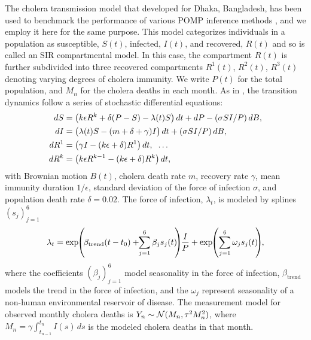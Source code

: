 \documentclass[9pt,twocolumn,pnasresearcharticle]{pnas-new}
\begin{document}
The cholera transmission model that \cite{king08} developed for Dhaka, Bangladesh, has been used to benchmark the performance of various POMP inference methods \cite{ionides15, fasiolo16, wycoff24}, and we employ it here for the same purpose.
This model categorizes individuals in a population as susceptible, $S(t)$, infected, $I(t)$, and recovered, $R(t)$ and so is called an SIR compartmental model.
In this case, the compartment $R(t)$ is further subdivided into 
three recovered compartments $R^1(t)$, $R^2(t)$, $R^3(t)$ denoting varying degrees of cholera immunity.
We write $P(t)$ for the total population, and $M_n$ for the cholera deaths in each month.
As in \cite{king08, ionides15}, the transition dynamics follow a series of stochastic differential equations:
\vspace*{-1mm}
\begin{align*}
    dS&=\big(k \epsilon R^k+\delta(P-S)-\lambda(t) S\big)\, dt+d P-({\sigma S I}/{P})\, dB, \\
    dI&=\big(\lambda(t) S-(m+\delta+\gamma) I\big)\, dt+({\sigma S I}/{P})\, dB, \\
    dR^1&=\big(\gamma I-(k \epsilon+\delta) R^1\big)\, dt, \hspace{2mm} \dots \\
    dR^k&=\big(k \epsilon R^{k-1} -(k \epsilon+\delta) R^k\big)\, dt,
    \vspace*{-2mm}
\end{align*}
with Brownian motion $B(t)$, cholera death rate $m$, recovery rate $\gamma$, mean immunity duration $1/\epsilon$, standard deviation of the force of infection $\sigma$, and population death rate $\delta=0.02$. The force of infection, $\lambda_t$, is modeled by splines $(s_j)_{j=1}^6$
\vspace*{-2mm}
\begin{equation*}    \lambda_t=\exp\hspace{-1mm}\left(\hspace{-.5mm}\beta_{\text{trend}}(t-t_0)+\hspace{-1mm}\sum_{j=1}^{6} \beta_j s_j(t)\hspace{-1mm}\right)\hspace{-1mm}\frac{I}{P} + \exp\hspace{-1mm} \left(\sum_{j=1}^{6} \omega_j s_j(t)\hspace{-1mm}\right)\hspace{-1mm},
    \vspace*{-2mm}
\end{equation*}
where the coefficients $(\beta_j)_{j=1}^6$ model seasonality in the force of infection, $\beta_{\text{trend}}$ models the trend in the force of infection, and the $\omega_j$ represent seasonality of a non-human environmental reservoir of disease.
The measurement model for observed monthly cholera deaths is
    $Y_n \sim {\mathcal{N}}(M_n, \tau^2M_n^2)$,
where $M_n=\gamma\int_{t_{n-1}}^{t_n}I(s)\, ds$ is the modeled cholera deaths in that month.
\end{document}
